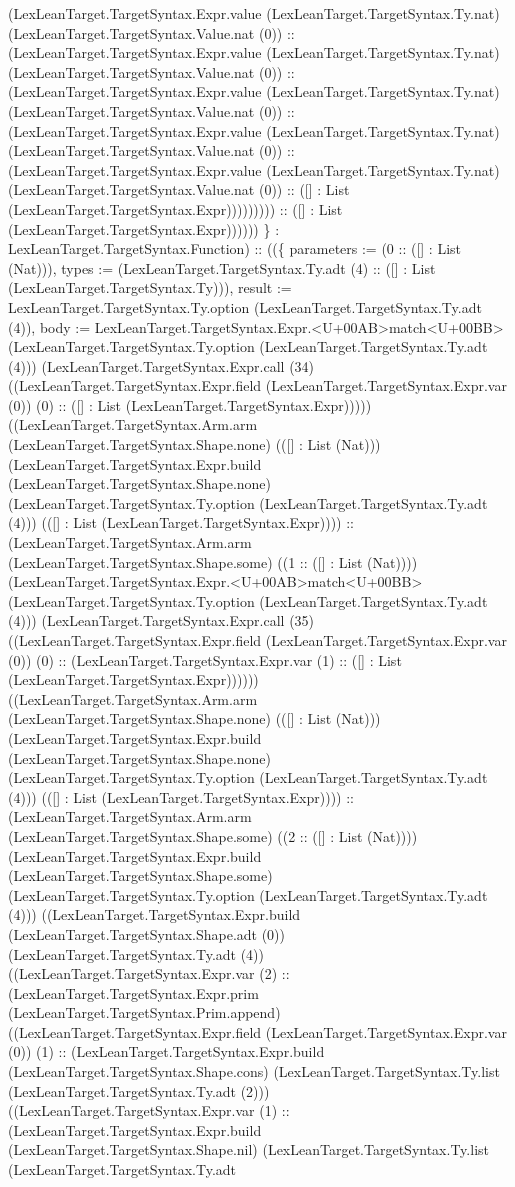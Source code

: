 \documentclass[11pt]{article}
\begin{document}
(LexLeanTarget.TargetSyntax.Expr.value (LexLeanTarget.TargetSyntax.Ty.nat) (LexLeanTarget.TargetSyntax.Value.nat (0)) :: (LexLeanTarget.TargetSyntax.Expr.value (LexLeanTarget.TargetSyntax.Ty.nat) (LexLeanTarget.TargetSyntax.Value.nat (0)) :: (LexLeanTarget.TargetSyntax.Expr.value (LexLeanTarget.TargetSyntax.Ty.nat) (LexLeanTarget.TargetSyntax.Value.nat (0)) :: (LexLeanTarget.TargetSyntax.Expr.value (LexLeanTarget.TargetSyntax.Ty.nat) (LexLeanTarget.TargetSyntax.Value.nat (0)) :: (LexLeanTarget.TargetSyntax.Expr.value (LexLeanTarget.TargetSyntax.Ty.nat) (LexLeanTarget.TargetSyntax.Value.nat (0)) :: ([] : List (LexLeanTarget.TargetSyntax.Expr))))))))) :: ([] : List (LexLeanTarget.TargetSyntax.Expr)))))) \} : LexLeanTarget.TargetSyntax.Function) :: ((\{ parameters := (0 :: ([] : List (Nat))), types := (LexLeanTarget.TargetSyntax.Ty.adt (4) :: ([] : List (LexLeanTarget.TargetSyntax.Ty))), result := LexLeanTarget.TargetSyntax.Ty.option (LexLeanTarget.TargetSyntax.Ty.adt (4)), body := LexLeanTarget.TargetSyntax.Expr.<U+00AB>match<U+00BB> (LexLeanTarget.TargetSyntax.Ty.option (LexLeanTarget.TargetSyntax.Ty.adt (4))) (LexLeanTarget.TargetSyntax.Expr.call (34) ((LexLeanTarget.TargetSyntax.Expr.field (LexLeanTarget.TargetSyntax.Expr.var (0)) (0) :: ([] : List (LexLeanTarget.TargetSyntax.Expr))))) ((LexLeanTarget.TargetSyntax.Arm.arm (LexLeanTarget.TargetSyntax.Shape.none) (([] : List (Nat))) (LexLeanTarget.TargetSyntax.Expr.build (LexLeanTarget.TargetSyntax.Shape.none) (LexLeanTarget.TargetSyntax.Ty.option (LexLeanTarget.TargetSyntax.Ty.adt (4))) (([] : List (LexLeanTarget.TargetSyntax.Expr)))) :: (LexLeanTarget.TargetSyntax.Arm.arm (LexLeanTarget.TargetSyntax.Shape.some) ((1 :: ([] : List (Nat)))) (LexLeanTarget.TargetSyntax.Expr.<U+00AB>match<U+00BB> (LexLeanTarget.TargetSyntax.Ty.option (LexLeanTarget.TargetSyntax.Ty.adt (4))) (LexLeanTarget.TargetSyntax.Expr.call (35) ((LexLeanTarget.TargetSyntax.Expr.field (LexLeanTarget.TargetSyntax.Expr.var (0)) (0) :: (LexLeanTarget.TargetSyntax.Expr.var (1) :: ([] : List (LexLeanTarget.TargetSyntax.Expr)))))) ((LexLeanTarget.TargetSyntax.Arm.arm (LexLeanTarget.TargetSyntax.Shape.none) (([] : List (Nat))) (LexLeanTarget.TargetSyntax.Expr.build (LexLeanTarget.TargetSyntax.Shape.none) (LexLeanTarget.TargetSyntax.Ty.option (LexLeanTarget.TargetSyntax.Ty.adt (4))) (([] : List (LexLeanTarget.TargetSyntax.Expr)))) :: (LexLeanTarget.TargetSyntax.Arm.arm (LexLeanTarget.TargetSyntax.Shape.some) ((2 :: ([] : List (Nat)))) (LexLeanTarget.TargetSyntax.Expr.build (LexLeanTarget.TargetSyntax.Shape.some) (LexLeanTarget.TargetSyntax.Ty.option (LexLeanTarget.TargetSyntax.Ty.adt (4))) ((LexLeanTarget.TargetSyntax.Expr.build (LexLeanTarget.TargetSyntax.Shape.adt (0)) (LexLeanTarget.TargetSyntax.Ty.adt (4)) ((LexLeanTarget.TargetSyntax.Expr.var (2) :: (LexLeanTarget.TargetSyntax.Expr.prim (LexLeanTarget.TargetSyntax.Prim.append) ((LexLeanTarget.TargetSyntax.Expr.field (LexLeanTarget.TargetSyntax.Expr.var (0)) (1) :: (LexLeanTarget.TargetSyntax.Expr.build (LexLeanTarget.TargetSyntax.Shape.cons) (LexLeanTarget.TargetSyntax.Ty.list (LexLeanTarget.TargetSyntax.Ty.adt (2))) ((LexLeanTarget.TargetSyntax.Expr.var (1) :: (LexLeanTarget.TargetSyntax.Expr.build (LexLeanTarget.TargetSyntax.Shape.nil) (LexLeanTarget.TargetSyntax.Ty.list (LexLeanTarget.TargetSyntax.Ty.adt 
\end{document}
